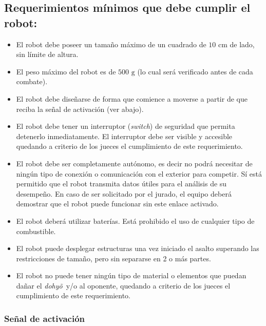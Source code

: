 \documentclass[a4paper,11pt]{article}
\newcommand{\cm}{\ensuremath{\mbox{~cm}}}
\newcommand{\gramos}{\ensuremath{\mbox{~g}}}
\newcommand{\dojo}{\emph{dohy\~{o}}~}
\begin{document}
\subsection*{Requerimientos mínimos que debe cumplir el robot:}
\begin{itemize}
  \item El robot debe poseer un tamaño máximo de un cuadrado de $10\cm$ de lado, sin límite de altura.
  \item El peso máximo del robot es de $500\gramos$ (lo cual será verificado antes de cada combate).
  \item El robot debe diseñarse de forma que comience a moverse a partir de que reciba la señal de activación (ver abajo).
  \item El robot debe tener un interruptor (\emph{switch}) de seguridad que permita detenerlo inmediatamente. El interruptor debe ser visible y accesible quedando a criterio de los jueces el cumplimiento de este requerimiento.
  \item El robot debe ser completamente autónomo, es decir no podrá necesitar de ningún tipo de conexión o comunicación con el exterior para competir. Sí está permitido que el robot transmita datos útiles para el análisis de su desempeño. En caso de ser solicitado por el jurado, el equipo deberá demostrar que el robot puede funcionar sin este enlace activado.
  \item El robot deberá utilizar baterías. Está prohibido el uso de cualquier tipo de combustible.
  \item El robot puede desplegar estructuras una vez iniciado el asalto superando las restricciones de tamaño, pero sin separarse en 2 o más partes.
  \item El robot no puede tener ningún tipo de material o elementos que puedan dañar el \dojo y/o al oponente, quedando a criterio de los jueces el cumplimiento de este requerimiento.
\end{itemize}

\subsubsection*{Señal de activación}
\end{document}
